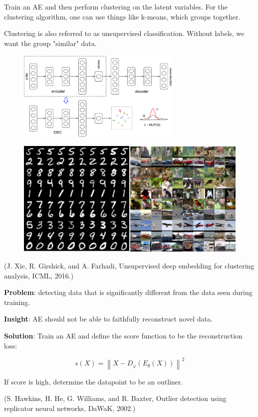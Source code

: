 \begin{concept}[9.6][Applications of AE]
    Train an AE and then perform clustering on the latent variables. For the clustering algorithm, one can use things like k-means, which groups together.

    Clustering is also referred to as unsupervised classification. Without labels, we want the group "similar" data.

    \begin{figure}[H]
        \centering
        \includegraphics[width=0.7\textwidth]{.././assets/9.4.png}
    \end{figure}

    \begin{figure}[H]
        \centering
        \includegraphics[width=1.0\textwidth]{.././assets/9.5.png}
    \end{figure}

    (J. Xie, R. Girshick, and A. Farhadi, Unsupervised deep embedding for clustering analysis, ICML, 2016.)
\end{concept}

\begin{concept}
    \textbf{Problem}: detecting data that is significantly different from the data seen during training.

    \textbf{Insight}: AE should not be able to faithfully reconstruct novel data.

    \textbf{Solution}: Train an AE and define the score function to be the reconstruction loss:

    $$
    s(X)=\left\|X-D_{\varphi}\left(E_{\theta}(X)\right)\right\|^{2}
    $$

    If score is high, determine the datapoint to be an outliner.

    (S. Hawkins, H. He, G. Williams, and R. Baxter, Outlier detection using replicator neural networks, DaWaK, 2002.)
\end{concept}
